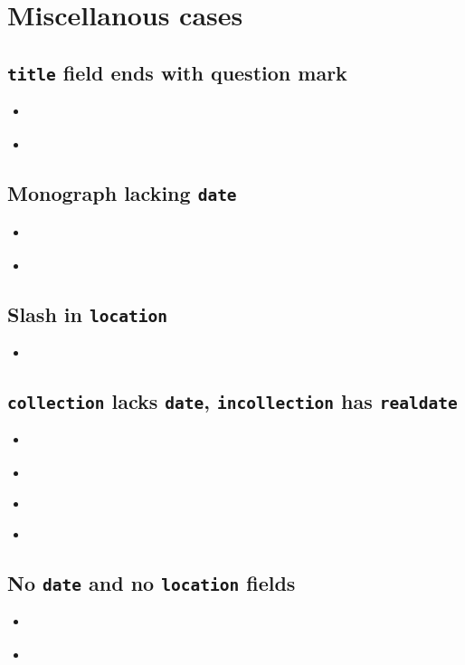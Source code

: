 \documentclass[a4paper,12pt]{scrartcl}
\newcommand*{\Typ}[1]{\texttt{\symbol{64}#1}}
\newcommand*{\Feld}[1]{\texttt{#1}}
\begin{document}
\section{Miscellanous cases}

\subsection{\Feld{title} field ends with question mark}
\begin{itemize}
    \item\cite{edenmo:1997}%
    \item{}
\end{itemize}

\subsection{Monograph lacking \Feld{date}}
\begin{itemize}
    \item\cite{siebert:u:et:al:o:j}%
    \item{}%
\end{itemize}


\subsection{Slash in \Feld{location}}
\begin{itemize}
    \item{}%
\end{itemize}

\subsection{\Typ{collection} lacks \Feld{date}, \Typ{incollection} has \Feld{realdate}}
\begin{itemize}
    \item\cite{huet:o:j}%
    \item{}%
    \item\cite{mette:1990}%
    \item{}%
\end{itemize}

\subsection{No \Feld{date} and no \Feld{location} fields}
\begin{itemize}
    \item\cite{fuchs:o:j}%
    \item{}%
\end{itemize}
\end{document}
